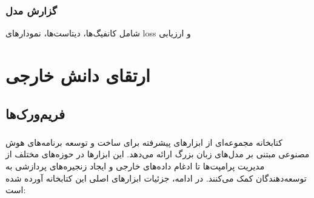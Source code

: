 \documentclass[11pt, a4paper, oneside]{book}
\begin{document}
				
			\subsection{گزارش  مدل}
				
				شامل کانفیگ‌ها، دیتاست‌ها، نمودارهای loss و ارزیابی
			
	\chapter{ارتقای دانش خارجی}
	
		\section{فریم‌ورک‌ها}
		
			\subsection{}
				
				کتابخانه  مجموعه‌ای از ابزارهای پیشرفته برای ساخت و توسعه برنامه‌های هوش مصنوعی مبتنی بر مدل‌های زبان بزرگ ارائه می‌دهد. این ابزارها در حوزه‌های مختلف از مدیریت پرامپت‌ها تا ادغام داده‌های خارجی و ایجاد زنجیره‌های پردازشی به توسعه‌دهندگان کمک می‌کنند. در ادامه، جزئیات ابزارهای اصلی این کتابخانه آورده شده است:
				
\end{document}
